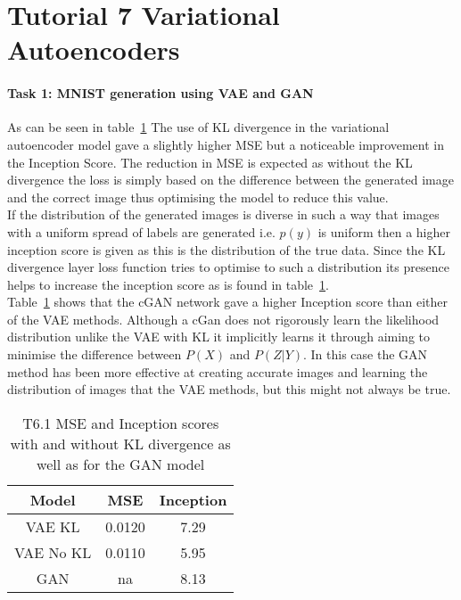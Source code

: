 \documentclass[10pt,twocolumn,letterpaper]{article}
\begin{document}

\section{Tutorial 7 Variational Autoencoders}

\paragraph{Task 1: MNIST generation using VAE and GAN}


As can be seen in table~\ref*{table:t71} The use of KL divergence in the variational autoencoder model gave a slightly higher MSE but a noticeable improvement in the Inception Score. The reduction in MSE is expected as without the KL divergence the loss is simply based on the difference between the generated image and the correct image thus optimising the model to reduce this value\cite{vae}. \\
If the distribution of the generated images is diverse in such a way that  images with a uniform spread of labels are generated i.e. $p(y)$ is uniform then a higher inception score is given\cite{kl-divergence} as this is the distribution of the true data. Since the KL divergence layer loss function tries to optimise to such a distribution\cite{kl-divergence} its presence helps to increase the inception score as is found in table~\ref*{table:t71}. \\
Table~\ref*{table:t71} shows that the cGAN network gave a higher Inception score than either of the VAE methods. Although a cGan does not rigorously learn the likelihood distribution unlike the VAE with KL it implicitly learns it through aiming to minimise the difference between $P(X)$ and $P(Z|Y)$\cite{gan}. In this case the GAN method has been more effective at creating accurate images and learning the distribution of images that the VAE methods, but this might not always be true.

\begin{table}[ht]
    \small
    \centering
    \begin{tabular}{|c|c|c|}
        \hline
        Model     & MSE & Inception \\
        \hline
        VAE KL & 0.0120 & 7.29 \\
        VAE No KL & 0.0110 & 5.95 \\
        GAN & na & 8.13 \\
        \hline
    \end{tabular}
    \medbreak
    \caption{T6.1 MSE and Inception scores with and without KL divergence as well as for the GAN model}
    \label{table:t71}
    \vspace{-0.7cm}
\end{table}
\end{document}
